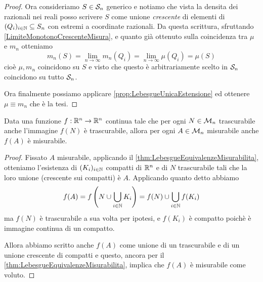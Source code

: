 \begin{proof}
	Ora consideriamo $S\in\S_n$ generico e notiamo che vista la densita dei razionali nei reali posso scrivere $S$ come unione \emph{crescente} di elementi di $(Q_i)_{i\in\N}\subseteq S_n$ con estremi a coordinate razionali. 
	Da questa scrittura, sfruttando \cref{LimiteMonotonoCrescenteMisura}, e quanto già ottenuto sulla coincidenza tra $\mu$ e $m_n$ otteniamo
	\begin{equation*}
		m_n(S)=\lim_{n\to\infty}m_n(Q_i)=\lim_{n\to\infty}\mu(Q_i)=\mu(S)
	\end{equation*}
	cioè $\mu,m_n$ coincidono su $S$ e visto che questo è arbitrariamente scelto in $\S_n$ coincidono su tutto $\S_n$.
	
	Ora finalmente possiamo applicare \cref{prop:LebesgueUnicaEstensione} ed ottenere $\mu\equiv m_n$ che è la tesi.
\end{proof}

\begin{proposition}\label{prop:ContinueSpecialiTengonoMisurabili}
	Data una funzione $f:\R^n\to\R^n$ continua tale che per ogni $N\in\M_n$ trascurabile anche l'immagine $f(N)$ è trascurabile, allora per ogni $A\in\M_n$ misurabile anche $f(A)$ è misurabile.
\end{proposition}
\begin{proof}
	Fissato $A$ misurabile, applicando il \cref{thm:LebesgueEquivalenzeMisurabilita}, otteniamo l'esistenza di $(K_i)_{i\in\N}$ compatti di $\R^n$ e di $N$ trascurabile tali che la loro unione (crescente sui compatti) è $A$. Applicando quanto detto abbiamo
	\begin{equation*}
		f(A)=f\left(N\cup\bigcup_{i\in\N}K_i\right)=f(N)\cup\bigcup_{i\in\N}f(K_i)
	\end{equation*}
	ma $f(N)$ è trascurabile a sua volta per ipotesi, e $f(K_i)$ è compatto poichè è immagine continua di un compatto.
	
	Allora abbiamo scritto anche $f(A)$ come unione di un trascurabile e di un unione crescente di compatti e questo, ancora per il \cref{thm:LebesgueEquivalenzeMisurabilita}, implica che $f(A)$ è misurabile come voluto.
\end{proof}

